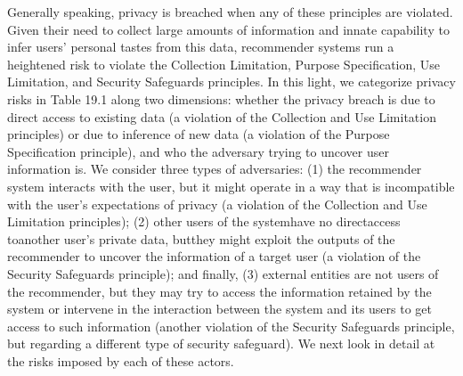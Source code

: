 Generally speaking, privacy is breached when any of these principles are violated. Given their need to collect large amounts of information and innate capability to infer users’ personal tastes from this data, recommender systems run a heightened risk to violate the Collection Limitation, Purpose Specification, Use Limitation, and Security Safeguards principles. In this light, we categorize privacy risks in Table 19.1 along two dimensions: whether the privacy breach is due to direct access to existing data (a violation of the Collection and Use Limitation principles) or due to inference of new data (a violation of the Purpose Specification principle), and who the adversary trying to uncover user information is. We consider three types of adversaries: (1) the recommender system interacts with the user, but it might operate in a way that is incompatible with the user's expectations of privacy (a violation of the Collection and Use Limitation principles); (2) other users of the systemhave no directaccess toanother user's private data, butthey might exploit the outputs of the recommender to uncover the information of a target user (a violation of the Security Safeguards principle); and finally, (3) external entities are not users of the recommender, but they may try to access the information retained by the system or intervene in the interaction between the system and its users to get access to such information (another violation of the Security Safeguards principle, but regarding a different type of security safeguard). We next look in detail at the risks imposed by each of these actors.
